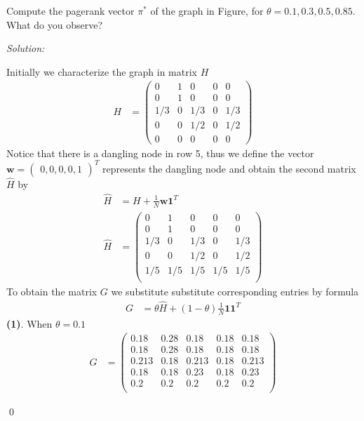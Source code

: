 \documentclass[12pt]{article}
\newenvironment{problem}[2][Problem]{\begin{trivlist}
\item[\hskip \labelsep {\bfseries #1}\hskip \labelsep {\bfseries #2.}]}{\end{trivlist}}
\newenvironment{sol}
    {\emph{Solution:}
    }
    {
    \qed
    }
\begin{document}
\begin{problem}{1}
	Compute the pagerank vector $\pi^*$ of the graph in Figure, for $\theta = 0.1, 0.3, 0.5, 0.85$. What do you observe?
\end{problem}
\begin{sol}
	Initially we characterize the graph in matrix $H$
	\begin{align*}
		H &= \begin{pmatrix} 0 & 1 & 0 & 0 & 0 \\ 0 & 1 & 0 & 0 & 0 \\ 1/3 & 0 & 1/3 & 0 & 1/3 \\ 0 & 0 & 1/2 & 0 & 1/2 \\ 0 & 0 & 0 & 0 & 0 \end{pmatrix}
	\end{align*}
	Notice that there is a dangling node in row 5, thus we define the vector $\textbf{w} = \begin{pmatrix}
	0, 0, 0, 0, 1
	\end{pmatrix}^T$ represents the dangling node and obtain the second matrix $\hat H$ by
	\begin{align*}
		\hat H &= H + \frac{1}{N} \textbf{w} \textbf{1}^T \\
		\hat H &= \begin{pmatrix}0 & 1 & 0 & 0 & 0 \\ 0 & 1 & 0 & 0 & 0 \\ 1/3 & 0 & 1/3 & 0 & 1/3 \\ 0 & 0 & 1/2 & 0 & 1/2 \\ 1/5 & 1/5 & 1/5 & 1/5 & 1/5 \\\end{pmatrix}
	\end{align*}
	To obtain the matrix $G$ we substitute substitute corresponding entries by formula 
	\begin{align*}
			G &= \theta\hat H +(1-\theta)\frac{1}{N}\textbf{11}^T
	\end{align*}
	\textbf{(1)}. When $\theta = 0.1$
	\begin{align*}
		G &= \begin{pmatrix}0.18 & 0.28 & 0.18 & 0.18 & 0.18 \\ 0.18 & 0.28 & 0.18 & 0.18 & 0.18 \\ 0.213 & 0.18 & 0.213 & 0.18 & 0.213 \\ 0.18 & 0.18 & 0.23 & 0.18 & 0.23 \\ 0.2 & 0.2 & 0.2 & 0.2 & 0.2 \\\end{pmatrix}		

\end{align*}
\end{sol}
\end{document}
